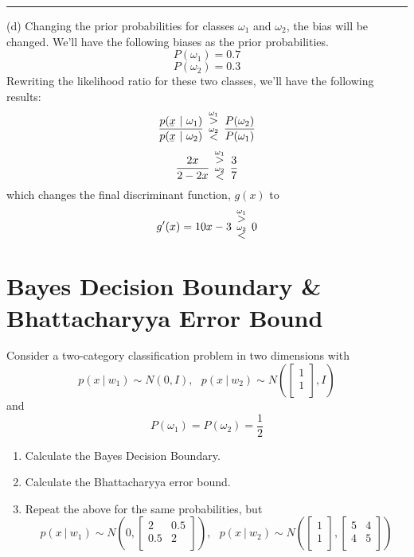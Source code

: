 \documentclass[12pt]{article}
\numberwithin{equation}{section}
\numberwithin{table}{section}
\numberwithin{figure}{section}
\newcommand*{\bfrac}[2]{\genfrac{}{}{0pt}{}{#1}{#2}}
\begin{document}
\noindent\rule{\textwidth}{.5pt}
(d) Changing the prior probabilities for classes $\omega_1$ and $\omega_2$, the bias will be changed. We'll have the following biases as the prior probabilities.
$$
	P(\omega_1) = 0.7
$$
$$
	P(\omega_2) = 0.3
$$
Rewriting the likelihood ratio for these two classes, we'll have the following results:
$$
	\frac{p(\underaccent{\bar}{x}\ |\ \omega_1)}{p(\underaccent{\bar}{x}\ |\ \omega_2)}\  \bfrac{\overset{\omega_1}{>}}{\overset{\omega_2}{<}}\ \frac{P(\omega_2)}{P(\omega_1)}
$$
$$
	\frac{2x}{2-2x}\  \bfrac{\overset{\omega_1}{>}}{\overset{\omega_2}{<}}\ \frac{3}{7}
$$
which changes the final discriminant function, $g(x)$ to
$$
	g'(x) = 10x - 3\ \bfrac{\overset{\omega_1}{>}}{\overset{\omega_2}{<}}\ 0
$$

\section{Bayes Decision Boundary \& Bhattacharyya Error Bound}
Consider a two-category classification problem in two dimensions with
$$
p(x\ |\ w_{1}) \sim N(0, I),\ \ \ p(x\ |\ w_{2}) \sim N(\begin{bmatrix}
1\\
1\\
\end{bmatrix}, I)
$$
and
$$
P(\omega_1) = P(\omega_2) = \frac{1}{2}
$$
\begin{enumerate}[label=(\alph*)]
	\item Calculate the Bayes Decision Boundary.
	
	\item Calculate the Bhattacharyya error bound.
	
	\item Repeat the above for the same probabilities, but
	$$
	p(x\ |\ w_{1}) \sim N(0, \begin{bmatrix}
	2 & 0.5\\
	0.5 & 2\\
	\end{bmatrix}),\ \ \ p(x\ |\ w_{2}) \sim N(\begin{bmatrix}
	1\\
	1\\
	\end{bmatrix}, \begin{bmatrix}
	5 & 4\\
	4 & 5\\
	\end{bmatrix})
	$$
\end{enumerate}
\end{document}
